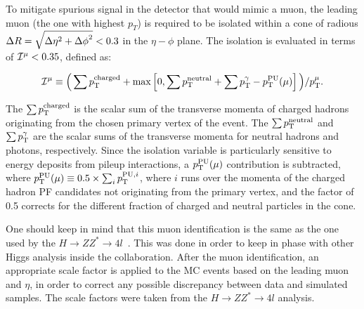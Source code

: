 To mitigate spurious signal in the detector that would mimic a muon, the leading muon (the one with highest $p_T$) is required to be isolated within a cone of radious $\Delta R = \sqrt{\smash[b]{\Delta \eta}^2 + {\Delta \phi}^2}< 0.3$ in the $\eta - \phi$ plane. The isolation is evaluated in terms of ${\cal I}^{\mu} < 0.35$, defined as:


\begin{equation}
\label{eqn:pfiso}
{\cal I}^{\mu} \equiv \Big( \sum p_{\mathrm{T}}^\text{charged} +
                                 \max\left[ 0, \sum p_{\mathrm{T}}^\text{neutral}
                                 +
                                  \sum p_{\mathrm{T}}^{\gamma}
                                 - p_{\mathrm{T}}^\mathrm{PU}(\mu) \right] \Big)
                                 / p_{\mathrm{T}}^{\mu}.
\end{equation}


The $\sum p_{\mathrm{T}}^\text{charged}$ is the scalar sum of the transverse momenta of charged hadrons originating from the chosen primary vertex of the event. The $\sum p_{\mathrm{T}}^\text{neutral}$ and $\sum p_{\mathrm{T}}^{\gamma}$ are the scalar sums of the transverse momenta for neutral hadrons and photons, respectively.  Since the isolation variable is particularly sensitive to energy deposits from pileup interactions, a $p_{\mathrm{T}}^\text{PU}(\mu)$ contribution is subtracted, where $p_{\mathrm{T}}^\mathrm{PU}(\mu) \equiv 0.5 \times \sum_i p_{\mathrm{T}}^{\mathrm{PU}, i}$, where $i$ runs over the momenta of the charged hadron PF candidates not originating from the primary vertex, and the factor of 0.5 corrects for the different fraction of charged and neutral particles in the cone. 








One should keep in mind that this muon identification is the same as the one used by the $H \rightarrow ZZ^{*} \rightarrow 4l$~\cite{higgs_zz_4l_papper}. This was done in order to keep in phase with other Higgs analysis inside the collaboration. After the muon identification, an appropriate scale factor is applied to the MC events based on the leading muon \PT and $\eta$, in order to correct any possible discrepancy between data and simulated samples. The scale factors were taken from the $H \rightarrow ZZ^{*} \rightarrow 4l$ analysis.

